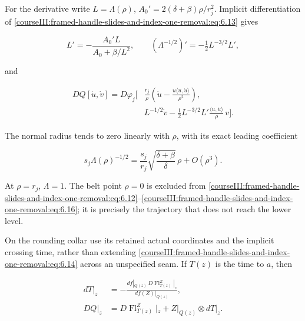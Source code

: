 For the derivative write \(L=\Lambda(\rho)\), \(A_0'=2(\delta+\beta)\rho/r_j^2\). Implicit differentiation of \eqref{courseIII:framed-handle-slides-and-index-one-removal:eq:6.13} gives

\begin{equation}
L'=-\frac{A_0'L}{A_0+\beta/L^2},\qquad
 (\Lambda^{-1/2})'=-\tfrac12L^{-3/2}L',
 \label{courseIII:framed-handle-slides-and-index-one-removal:eq:6.15}
\end{equation}

and

\begin{equation}
\begin{aligned}
 DQ[\dot u,\dot v]
 =D\varphi_j\Bigg[
 &\frac{r_j}{\rho}
      \left(\dot u-\frac{u\langle u,\dot u\rangle}{\rho^2}\right),\\
 &L^{-1/2}\dot v
     -\tfrac12L^{-3/2}L'
           \frac{\langle u,\dot u\rangle}{\rho}\,v
 \Bigg].
 \end{aligned}
 \label{courseIII:framed-handle-slides-and-index-one-removal:eq:6.16}
\end{equation}

The normal radius tends to zero linearly with \(\rho\), with its exact leading coefficient

\begin{equation}
s_j\Lambda(\rho)^{-1/2}
   =\frac{s_j}{r_j}
       \sqrt{\frac{\delta+\beta}{\delta}}\,
          \rho+O(\rho^3).
 \label{courseIII:framed-handle-slides-and-index-one-removal:eq:6.17}
\end{equation}

At \(\rho=r_j\), \(\Lambda=1\). The belt point \(\rho=0\) is excluded from \eqref{courseIII:framed-handle-slides-and-index-one-removal:eq:6.12}--\eqref{courseIII:framed-handle-slides-and-index-one-removal:eq:6.16}; it is precisely the trajectory that does not reach the lower level.

On the rounding collar use its retained actual coordinates and the implicit crossing time, rather than extending \eqref{courseIII:framed-handle-slides-and-index-one-removal:eq:6.14} across an unspecified seam. If \(T(z)\) is the time to \(a\), then

\begin{equation}
\begin{aligned}
 dT|_z
   &=-\frac{df|_{Q(z)}\,D\operatorname{Fl}^Z_{T(z)}|_z}
                 {df(Z)|_{Q(z)}},\\
 DQ|_z
   &=D\operatorname{Fl}^Z_{T(z)}|_z
            +Z|_{Q(z)}\otimes dT|_z .
 \end{aligned}
 \label{courseIII:framed-handle-slides-and-index-one-removal:eq:6.18}
\end{equation}

